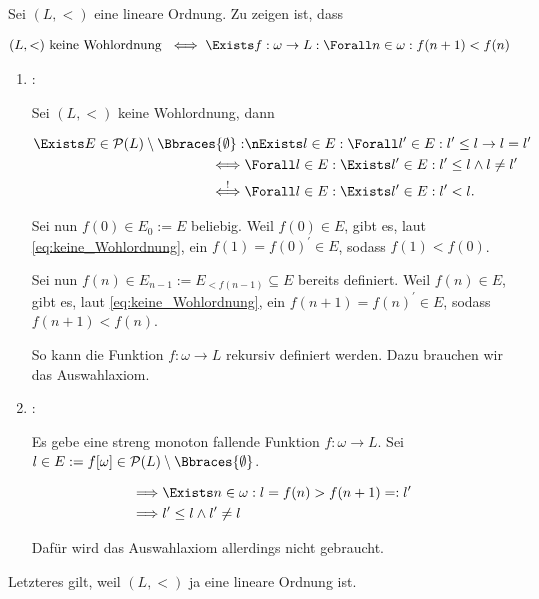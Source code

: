 \begin{solution}

Sei $(L, <)$ eine lineare Ordnung.
Zu zeigen ist, dass

\begin{align*}
    (L, <) ~\text{keine Wohlordnung}~
    \iff
    \Exists f: \omega \to L:
        \Forall n \in \omega:
            f(n + 1) < f(n)
\end{align*}

\begin{enumerate}[label = \texttt{ad}]

    \item \Quote{$\implies$}:
    
    Sei $(L, <)$ keine Wohlordnung, dann

    \begin{align} \label{eq:keine_Wohlordnung}
        \begin{split}
            \Exists E \in \mathcal{P}(L) \setminus \Bbraces{\emptyset}:
                & \nExists l \in E: 
                    \Forall l^\prime \in E:
                        l^\prime \leq l \to l = l^\prime \\
                \iff
                & \Forall l \in E:
                    \Exists l^\prime \in E:
                        l^\prime \leq l \land l \neq l^\prime \\
                \stackrel{!}{\iff}
                & \Forall l \in E:
                    \Exists l^\prime \in E:
                        l^\prime < l.            
        \end{split}
    \end{align}

    Sei nun $f(0) \in E_0 := E$ beliebig.
    Weil $f(0) \in E$, gibt es, laut \eqref{eq:keine_Wohlordnung}, ein $f(1) = f(0)^\prime \in E$, sodass $f(1) < f(0)$.

    Sei nun $f(n) \in E_{n-1} := E_{< f(n-1)} \subseteq E$ bereits definiert.
    Weil $f(n) \in E$, gibt es, laut \eqref{eq:keine_Wohlordnung}, ein $f(n + 1) = f(n)^\prime \in E$, sodass $f(n + 1) < f(n)$.

    So kann die Funktion $f: \omega \to L$ rekursiv definiert werden.
    Dazu brauchen wir das Auswahlaxiom.

    \item \Quote{$\impliedby$}:

    Es gebe eine streng monoton fallende Funktion $f: \omega \to L$.
    Sei $l \in E := f[\omega] \in \mathcal{P}(L) \setminus \Bbraces{\emptyset}$.
    
    \begin{align*}
        \implies &
        \Exists n \in \omega:
            l = f(n) > f(n + 1) =: l^\prime \\
        \implies &
        l^\prime \leq l \land l^\prime \neq l
    \end{align*}

    Dafür wird das Auswahlaxiom allerdings nicht gebraucht.

\end{enumerate}

Letzteres \Quote{!} gilt, weil $(L, <)$ ja eine lineare Ordnung ist.

\end{solution}

    